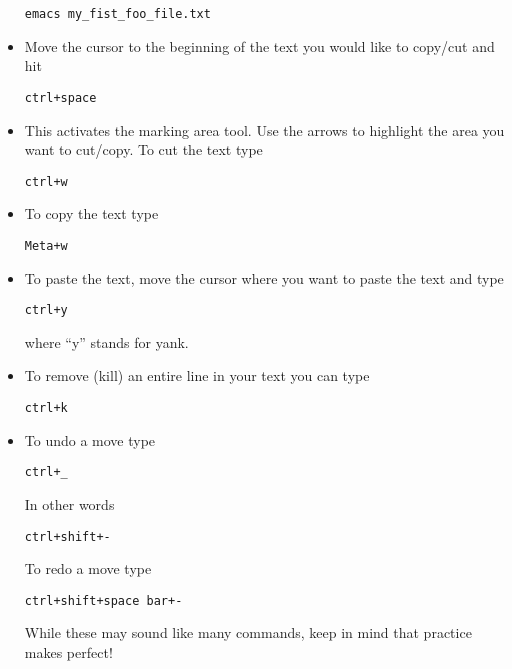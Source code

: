 \documentclass[aps,showpacs,prd,notitlepage,preprintnumbers,amsmath,amssymb,letterpaper]{revtex4}
\begin{document}
\begin{itemize}
\begin{verbatim}
emacs my_fist_foo_file.txt
\end{verbatim}

\item Move the cursor to the beginning of the text you would like to copy/cut and hit

\begin{verbatim}
ctrl+space
\end{verbatim}

\item This activates the marking area tool. Use the arrows to highlight the area you want to cut/copy.
To cut the text type

\begin{verbatim}
ctrl+w
\end{verbatim}

\item To copy the text type

\begin{verbatim}
Meta+w
\end{verbatim}


\item To paste the text, move the cursor where you want to paste the text and type

\begin{verbatim}
ctrl+y
\end{verbatim}

where ``y'' stands for yank.

\item To remove (kill) an entire line in your text you can type

\begin{verbatim}
ctrl+k
\end{verbatim}

\item To undo a move type

\begin{verbatim}
ctrl+_
\end{verbatim}

In other words

\begin{verbatim}
ctrl+shift+-
\end{verbatim}

To redo a move type

\begin{verbatim}
ctrl+shift+space bar+-
\end{verbatim}

While these may sound like many commands, keep in mind that practice makes perfect!
\end{itemize}
\end{document}
